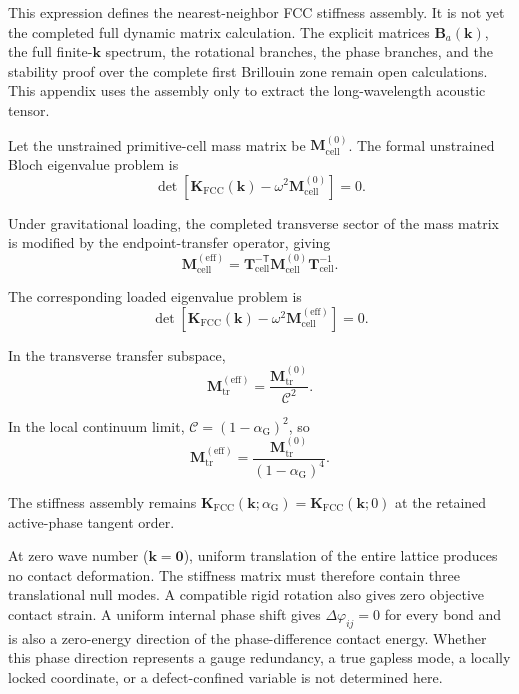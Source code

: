 This expression defines the nearest-neighbor FCC stiffness assembly. It is not yet the completed full dynamic matrix calculation. The explicit matrices $\mathbf{B}_a(\mathbf{k})$, the full finite-$\mathbf{k}$ spectrum, the rotational branches, the phase branches, and the stability proof over the complete first Brillouin zone remain open calculations. This appendix uses the assembly only to extract the long-wavelength acoustic tensor.

Let the unstrained primitive-cell mass matrix be $\mathbf{M}_{\mathrm{cell}}^{(0)}$. The formal unstrained Bloch eigenvalue problem is
\begin{equation}
    \det\left[ \mathbf{K}_{\mathrm{FCC}}(\mathbf{k}) - \omega^2\mathbf{M}_{\mathrm{cell}}^{(0)} \right] = 0.
\end{equation}

Under gravitational loading, the completed transverse sector of the mass matrix is modified by the endpoint-transfer operator, giving
\begin{equation}
    \mathbf{M}_{\mathrm{cell}}^{(\mathrm{eff})} = \mathbf{T}_{\mathrm{cell}}^{-\mathsf{T}} \mathbf{M}_{\mathrm{cell}}^{(0)} \mathbf{T}_{\mathrm{cell}}^{-1}.
\end{equation}

The corresponding loaded eigenvalue problem is
\begin{equation}
    \det\left[ \mathbf{K}_{\mathrm{FCC}}(\mathbf{k}) - \omega^2\mathbf{M}_{\mathrm{cell}}^{(\mathrm{eff})} \right] = 0.
\end{equation}

In the transverse transfer subspace,
\begin{equation}
    \mathbf{M}_{\mathrm{tr}}^{(\mathrm{eff})} = \frac{\mathbf{M}_{\mathrm{tr}}^{(0)}}{\mathcal{C}^2}.
\end{equation}

In the local continuum limit, $\mathcal{C}=(1-\alpha_{\mathrm{G}})^2$, so
\begin{equation}
    \mathbf{M}_{\mathrm{tr}}^{(\mathrm{eff})} = \frac{\mathbf{M}_{\mathrm{tr}}^{(0)}}{(1-\alpha_{\mathrm{G}})^4}.
\end{equation}

The stiffness assembly remains $\mathbf{K}_{\mathrm{FCC}}(\mathbf{k};\alpha_{\mathrm{G}}) = \mathbf{K}_{\mathrm{FCC}}(\mathbf{k};0)$ at the retained active-phase tangent order.

At zero wave number ($\mathbf{k}=\mathbf{0}$), uniform translation of the entire lattice produces no contact deformation. The stiffness matrix must therefore contain three translational null modes. A compatible rigid rotation also gives zero objective contact strain. A uniform internal phase shift gives $\Delta\varphi_{ij}=0$ for every bond and is also a zero-energy direction of the phase-difference contact energy. Whether this phase direction represents a gauge redundancy, a true gapless mode, a locally locked coordinate, or a defect-confined variable is not determined here.

